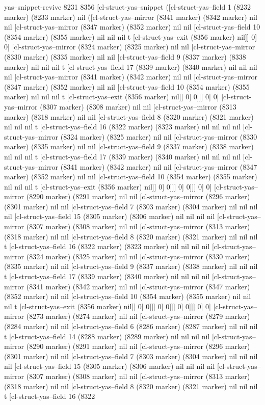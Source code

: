 {{yas--snippet-revive 8231 8356 [cl-struct-yas--snippet ([cl-struct-yas--field 1 (8232 marker) (8233 marker) nil ([cl-struct-yas--mirror (8341 marker) (8342 marker) nil nil [cl-struct-yas--mirror (8347 marker) (8352 marker) nil nil [cl-struct-yas--field 10 (8354 marker) (8355 marker) nil nil nil t [cl-struct-yas--exit (8356 marker) nil]] 0] 0] [cl-struct-yas--mirror (8324 marker) (8325 marker) nil nil [cl-struct-yas--mirror (8330 marker) (8335 marker) nil nil [cl-struct-yas--field 9 (8337 marker) (8338 marker) nil nil nil t [cl-struct-yas--field 17 (8339 marker) (8340 marker) nil nil nil nil [cl-struct-yas--mirror (8341 marker) (8342 marker) nil nil [cl-struct-yas--mirror (8347 marker) (8352 marker) nil nil [cl-struct-yas--field 10 (8354 marker) (8355 marker) nil nil nil t [cl-struct-yas--exit (8356 marker) nil]] 0] 0]]] 0] 0] [cl-struct-yas--mirror (8307 marker) (8308 marker) nil nil [cl-struct-yas--mirror (8313 marker) (8318 marker) nil nil [cl-struct-yas--field 8 (8320 marker) (8321 marker) nil nil nil t [cl-struct-yas--field 16 (8322 marker) (8323 marker) nil nil nil nil [cl-struct-yas--mirror (8324 marker) (8325 marker) nil nil [cl-struct-yas--mirror (8330 marker) (8335 marker) nil nil [cl-struct-yas--field 9 (8337 marker) (8338 marker) nil nil nil t [cl-struct-yas--field 17 (8339 marker) (8340 marker) nil nil nil nil [cl-struct-yas--mirror (8341 marker) (8342 marker) nil nil [cl-struct-yas--mirror (8347 marker) (8352 marker) nil nil [cl-struct-yas--field 10 (8354 marker) (8355 marker) nil nil nil t [cl-struct-yas--exit (8356 marker) nil]] 0] 0]]] 0] 0]]] 0] 0] [cl-struct-yas--mirror (8290 marker) (8291 marker) nil nil [cl-struct-yas--mirror (8296 marker) (8301 marker) nil nil [cl-struct-yas--field 7 (8303 marker) (8304 marker) nil nil nil nil [cl-struct-yas--field 15 (8305 marker) (8306 marker) nil nil nil nil [cl-struct-yas--mirror (8307 marker) (8308 marker) nil nil [cl-struct-yas--mirror (8313 marker) (8318 marker) nil nil [cl-struct-yas--field 8 (8320 marker) (8321 marker) nil nil nil t [cl-struct-yas--field 16 (8322 marker) (8323 marker) nil nil nil nil [cl-struct-yas--mirror (8324 marker) (8325 marker) nil nil [cl-struct-yas--mirror (8330 marker) (8335 marker) nil nil [cl-struct-yas--field 9 (8337 marker) (8338 marker) nil nil nil t [cl-struct-yas--field 17 (8339 marker) (8340 marker) nil nil nil nil [cl-struct-yas--mirror (8341 marker) (8342 marker) nil nil [cl-struct-yas--mirror (8347 marker) (8352 marker) nil nil [cl-struct-yas--field 10 (8354 marker) (8355 marker) nil nil nil t [cl-struct-yas--exit (8356 marker) nil]] 0] 0]]] 0] 0]]] 0] 0]]] 0] 0] [cl-struct-yas--mirror (8273 marker) (8274 marker) nil nil [cl-struct-yas--mirror (8279 marker) (8284 marker) nil nil [cl-struct-yas--field 6 (8286 marker) (8287 marker) nil nil nil t [cl-struct-yas--field 14 (8288 marker) (8289 marker) nil nil nil nil [cl-struct-yas--mirror (8290 marker) (8291 marker) nil nil [cl-struct-yas--mirror (8296 marker) (8301 marker) nil nil [cl-struct-yas--field 7 (8303 marker) (8304 marker) nil nil nil nil [cl-struct-yas--field 15 (8305 marker) (8306 marker) nil nil nil nil [cl-struct-yas--mirror (8307 marker) (8308 marker) nil nil [cl-struct-yas--mirror (8313 marker) (8318 marker) nil nil [cl-struct-yas--field 8 (8320 marker) (8321 marker) nil nil nil t [cl-struct-yas--field 16 (8322 }}
